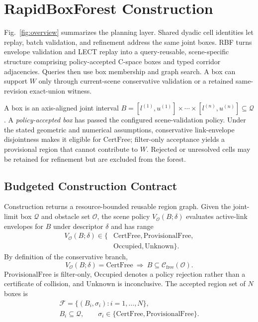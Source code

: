 \documentclass[journal]{IEEEtran}
\newcommand{\rbf}{RBF}
\newcommand{\Cfree}{\ensuremath{\mathcal{C}_{\mathrm{free}}}}
\newcommand{\calO}{\ensuremath{\mathcal{O}}}
\newcommand{\Q}{\ensuremath{\mathcal{Q}}}
\newcommand{\cspace}{\mbox{C-space}}
\begin{document}
\section{RapidBoxForest Construction}\label{sec:forest}

Fig.~\ref{fig:overview} summarizes the planning layer. Shared dyadic cell
identities let replay, batch validation, and refinement address the same joint
boxes. \rbf{} turns envelope validation and LECT replay into a query-reusable,
scene-specific structure comprising policy-accepted \cspace{} boxes and typed
corridor adjacencies.
Queries then use box membership and graph search. A box can support $W$ only
through current-scene conservative validation or a retained same-revision
exact-union witness.

A box is an axis-aligned joint interval
$B=[l^{(1)},u^{(1)}]\times\cdots\times[l^{(n)},u^{(n)}]\subseteq\Q$.
A \emph{policy-accepted box} has passed the configured scene-validation policy.
Under the stated geometric and numerical assumptions, conservative link-envelope
disjointness makes it eligible for \(\mathrm{CertFree}\); filter-only acceptance
yields a provisional region that cannot contribute to $W$. Rejected or
unresolved cells may be retained for refinement but are excluded from the
forest.

\subsection{Budgeted Construction Contract}\label{sec:forest_objective}

Construction returns a resource-bounded reusable region graph. Given the
joint-limit box $\Q$ and obstacle set $\calO$, the scene policy
$V_{\calO}(B;\delta)$ evaluates active-link envelopes for $B$ under descriptor
$\delta$ and has range
\[
\begin{split}
V_{\calO}(B;\delta)\in\{&\mathrm{CertFree},\mathrm{ProvisionalFree},\\[-1mm]
&\mathrm{Occupied},\mathrm{Unknown}\}.
\end{split}
\]
By definition of the conservative branch,
\[
V_{\calO}(B;\delta)=\mathrm{CertFree}
\ \Longrightarrow\ B\subseteq\Cfree(\calO).
\]
\(\mathrm{ProvisionalFree}\) is filter-only, \(\mathrm{Occupied}\) denotes a
policy rejection rather than a certificate of collision, and
\(\mathrm{Unknown}\) is inconclusive. The accepted region set of \(N\) boxes is
\[
\begin{gathered}
\mathcal{F}=\bigl\{(B_i,\sigma_i):i=1,\ldots,N\bigr\},\\
B_i\subseteq\Q,\qquad \sigma_i\in
\{\mathrm{CertFree},\mathrm{ProvisionalFree}\}.
\end{gathered}
\]
\end{document}
